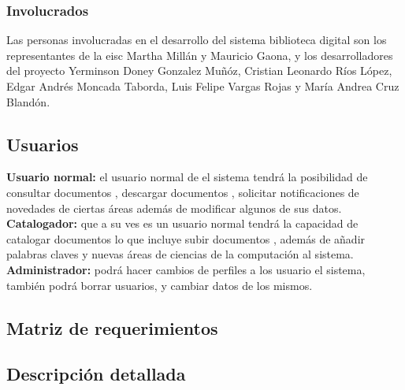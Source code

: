                 \subsubsection{Involucrados}
                Las personas involucradas en el desarrollo del sistema biblioteca digital son los
                representantes de la eisc Martha Millán y Mauricio Gaona, y los desarrolladores del
                proyecto Yerminson Doney Gonzalez Muñóz, Cristian Leonardo Ríos López, Edgar Andrés
                Moncada Taborda, Luis Felipe Vargas Rojas y María Andrea Cruz Blandón.
                
        \subsection{Usuarios}
        \textbf{Usuario normal:} el usuario normal de el sistema tendrá la posibilidad de consultar
        documentos , descargar documentos , solicitar notificaciones de novedades de ciertas áreas
        además de modificar algunos de sus datos.\\
        
        \textbf{Catalogador:} que a su ves es un usuario normal tendrá la capacidad de catalogar
        documentos lo que incluye subir documentos , además de añadir palabras claves y nuevas
        áreas de ciencias de la computación al sistema.\\
        
        \textbf{Administrador:} podrá hacer cambios de perfiles a los usuario el sistema, también
        podrá borrar usuarios, y cambiar datos de los mismos.


		\subsection{Matriz de requerimientos}
               
       
        \subsection{Descripción detallada}
                
                
                
                
